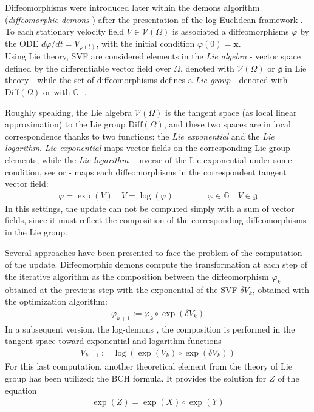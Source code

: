 Diffeomorphisms were introduced later within the demons algorithm (\emph{diffeomorphic demons} \cite{vercauteren2006robust}) after the presentation of the log-Euclidean framework \cite{Arsigny:MRM:06}. 
To each stationary velocity field $V \in \mathcal{V}(\Omega)$ is associated a diffeomorphisms $\varphi$ by the ODE $d\varphi /dt = V_{\varphi(t)} $, with the initial condition $\varphi(0) = \mathbf{x}$.\\
Using Lie theory, SVF are considered elements in the \emph{Lie algebra} - vector space defined by the differentiable vector field over $\Omega$, denoted with $\mathcal{V}(\Omega)$ or $\mathfrak{g}$ in Lie theory - while the set of diffeomorphisms defines a \emph{Lie group} - denoted with $\text{Diff}(\Omega)$ or with $\mathbb{G}$ -.

Roughly speaking, the Lie algebra $\mathcal{V}(\Omega)$ is the tangent space (as local linear approximation) to the Lie group $\text{Diff}(\Omega)$, and these two spaces are in local correspondence thanks to two functions: the \emph{Lie exponential} and the \emph{Lie logarithm}. \emph{Lie exponential} maps vector fields on the corresponding Lie group elements, while the \emph{Lie logarithm} - inverse of the Lie exponential under some condition, see \cite{do1976differential} or \cite{lee2012introduction} - maps each diffeomorphisms in the correspondent tangent vector field:
\begin{align*}
\varphi = \exp(V)  
\quad
V = \log(\varphi ) 
\qquad \qquad
\varphi  \in \mathbb{G}
\quad
V \in \mathfrak{g}
\end{align*}
In this settings, the update can not be computed simply with a sum of vector fields, since it must reflect the composition of the corresponding diffeomorphisms in the Lie group.

Several approaches have been presented to face the problem of the computation of the update. Diffeomorphic demons compute the transformation at each step of the iterative algorithm as the composition between the diffeomorphism $\varphi_{k}$ obtained at the previous step with the exponential of the SVF $\delta V_{k}$, obtained with the optimization algorithm:
\begin{align*}
\varphi_{k + 1} := \varphi_{k}  \circ \exp(\delta V_{k})
\end{align*}
In a subsequent version, the log-demons \cite{vercauteren08}, the composition is performed in the tangent space toward exponential and logarithm functions
\begin{align}\label{eq:bch_problem}
V_{k + 1} := \log( \exp(V_{k})  \circ \exp(\delta V_{k}))
\end{align}
For this last computation, another theoretical element from the theory of Lie group has been utilized: the BCH formula. It provides the solution for $Z$ of the equation 
\begin{align*}
 \exp(Z) = \exp(X)\circ\exp(Y)
\end{align*}

